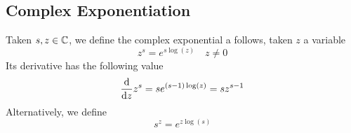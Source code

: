 \documentclass[../complete.tex]{subfiles}
\begin{document}
\subsection{Complex Exponentiation}
\begin{dfn}
	Taken $s,z\in\mathbb{C}$, we define the complex exponential a follows, taken $z$ a variable
	\begin{equation}
		z^s=e^{s\log(z)}\quad z\ne0
		\label{eq:complexexp}
	\end{equation}
	Its derivative has the following value
	\begin{equation}
		\derivative{z}z^s=se^{(s-1)\log(z)}=sz^{s-1}
		\label{eq:complexexpder}
	\end{equation}
	Alternatively, we define
	\begin{equation}
		s^z=e^{z\log(s)}
		\label{eq:revexpcf}
	\end{equation}
\end{dfn}
\end{document}
